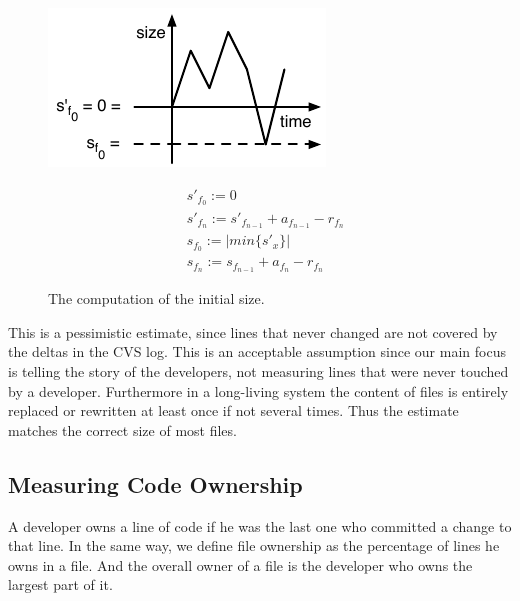 \begin{figure}[htbp]
\begin{minipage}[c]{.45\linewidth}
\includegraphics[width=1.2\linewidth]{fig/chronia-minimum}
 \end{minipage}
 \hfill
 \begin{minipage}[c]{.5\linewidth}
\begin{eqnarray}
& s'_{f_0} := 0 \nonumber \\
& s'_{f_n} := s'_{f_{n-1}} + a_{f_{n-1}} - r_{f_n} \nonumber  \\
& s_{f_0} := \vert min \{ s'_x \} \vert \nonumber \\
& s_{f_n} := s_{f_{n-1}} + a_{f_n} - r_{f_n} \nonumber
 \end{eqnarray}
 \end{minipage}
\caption{The computation of the initial size.}
\label{fig:filesize}
\end{figure}

This is a pessimistic estimate, since lines that never changed are not covered by the deltas in the CVS log. This is an acceptable assumption since our main focus is telling the story of the developers, not measuring lines that were never touched by a developer. Furthermore in a long-living system the content of files is entirely replaced or rewritten at least once if not several times. Thus the estimate matches the correct size of most files.

\subsection{Measuring Code Ownership}

A developer owns a line of code if he was the last one who committed a change to that line. In the same way, we define file ownership as the percentage of lines he owns in a file. And the overall owner of a file is the developer who owns the largest part of it.

